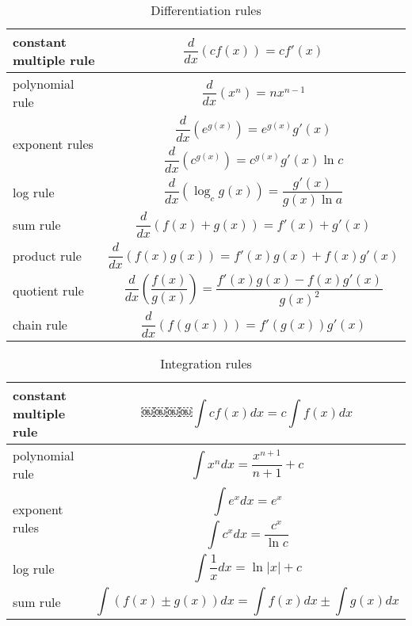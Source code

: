 \clearpage

 \begin{table}
 \caption{Differentiation rules}
\footnotesize
 \vspace{1em} 
 \begin{center}
 \begin{tabularx}{0.9\textwidth}{|l|X|}
 \hline
 constant multiple rule & \[\frac{d}{dx}\left(cf\left(x\right)\right) = cf'\left(x\right)\]\\\hline
polynomial rule &\[\frac{d}{dx}\left(x^n\right) = nx^{n-1}\]\\\hline
\multirow{2}{*}{exponent rules} & \[\frac{d}{dx}\left(e^{g(x)}\right) = e^{g(x)}g'(x)\]\\
 & \[\frac{d}{dx}\left(c^{g(x)}\right) = c^{g(x)}g'(x)\ln c\]\\\hline
 log rule & \[\frac{d}{dx}\left(\log _c g\left(x\right)\right) = \frac{g'(x)}{g(x)\ln a}\]\\\hline
 sum rule & \[\frac{d}{dx}\left(f\left(x\right) + g\left(x\right)\right) = f'(x) + g'(x)\]\\\hline
 product rule & \[\frac{d}{dx}\left(f\left(x\right)g\left(x\right)\right) = f'(x)g(x) + f(x)g'(x)\]\\\hline
 quotient rule & \[\frac{d}{dx}\left(\frac{f(x)}{g(x)}\right) = \frac{f'(x)g(x)-f(x)g'(x)}{g(x)^2}\]\\\hline
 chain rule & \[\frac{d}{dx}\left(f\left(g\left(x\right)\right)\right) = f'\left(g\left(x\right)\right)g'(x)\]\\\hline
 \end{tabularx}
 \end{center}
\end{table}
 \begin{table}
 \caption{Integration rules} 
\vspace{1em} \begin{center}
\footnotesize
 \begin{tabularx}{0.9\textwidth}{|l|X|}
 \hline
 constant multiple rule & \[￼￼￼￼\int cf\left(x\right) dx = c\int f(x) dx\]\\\hline
polynomial rule &\[\int x^n dx = \frac{x^{n+1}}{n+1} + c\]\\\hline
\multirow{2}{*}{exponent rules} & \[\int e^{x} dx = e^{x}\]\\
 & \[\int c^x dx = \frac{c^x}{\ln c}\]\\\hline
 log rule & \[\int \frac{1}{x} dx = \ln |x| + c\]\\\hline
 sum rule & \[\int\left(f(x)\pm g(x)\right) dx  = \int f(x) dx \pm \int g(x) dx\]\\\hline
 \end{tabularx}
 \end{center}
\end{table}


